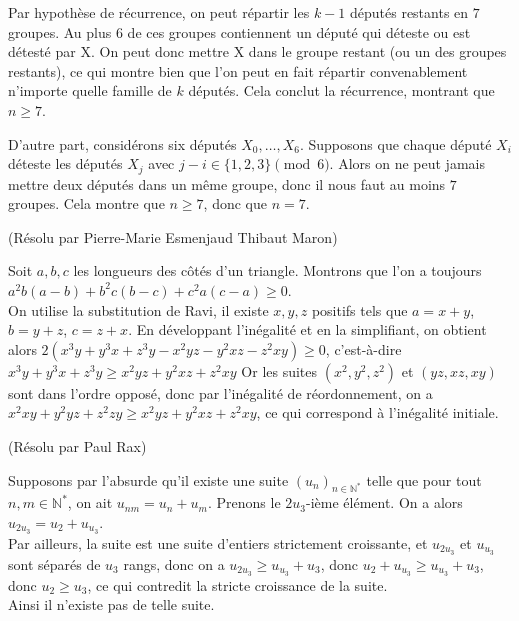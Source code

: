 \begin{sol}[75]
\begin{sol}[102]
Par hypothèse de récurrence, on peut répartir les $k-1$ députés restants en $7$ groupes.
Au plus $6$ de ces groupes contiennent un député qui déteste ou est détesté par X.
On peut donc mettre X dans le groupe restant (ou un des groupes restants),
ce qui montre bien que l'on peut en fait répartir convenablement n'importe quelle famille de $k$ députés.
Cela conclut la récurrence, montrant que $n \geq 7$.

D'autre part, considérons six députés $X_0,\ldots,X_6$.
Supposons que chaque député $X_i$ déteste les députés $X_j$ avec $j-i \in \{1,2,3\} \pmod{6}$.
Alors on ne peut jamais mettre deux députés dans un même groupe, donc il nous faut au moins $7$ groupes.
Cela montre que $n \geq 7$, donc que $n = 7$.
\end{sol}

\begin{sol}[130](Résolu par Pierre-Marie Esmenjaud Thibaut Maron)

Soit $a,b,c$ les longueurs des côtés d'un triangle. Montrons que l'on a toujours $a^2b(a-b)+b^2c(b-c)+c^2a(c-a) \geq 0$.\\
On utilise la substitution de Ravi, il existe $x,y,z$ positifs tels que 
$a=x+y$,$b=y+z$, $c=z+x$.
En développant l'inégalité et en la simplifiant, on obtient alors
$2(x^3y+y^3x+z^3y-x^2yz-y^2xz-z^2xy) \geq 0$,
c'est-\`a-dire $x^3y+y^3x+z^3y \geq x^2yz+y^2xz+z^2xy$
Or les suites $(x^2,y^2,z^2)$ et $(yz,xz,xy)$ sont dans l'ordre opposé, donc par l'in\'egalit\'e de r\'eordonnement,
on a $x^2xy+y^2yz+z^2zy \geq x^2yz+y^2xz+z^2xy$, ce qui correspond \`a l'in\'egalit\'e initiale.

\end{sol}

\begin{sol}[130](Résolu par Paul Rax)

Supposons par l'absurde qu'il existe une suite $(u_n)_{n \in \mathbb{N}^*}$ telle que pour tout $n,m \in \mathbb{N}^*$, on ait
$u_{nm}=u_n+u_m$. Prenons le $2u_3$-i\`eme \'el\'ement. On a alors $u_{2u_3}=u_2+u_{u_3}$.\\
Par ailleurs, la suite est une suite d'entiers strictement croissante, et $u_{2u_3}$ et $u_{u_3}$ sont s\'epar\'es de $u_3$ rangs,
donc on a $u_{2u_3} \geq u_{u_3} +u_3$, donc $u_2+u_{u_3} \geq u_{u_3} +u_3$, donc $u_2 \geq u_3$, ce qui contredit la stricte croissance de la suite.\\
Ainsi il n'existe pas de telle suite.

\end{sol}




\end{sol}

